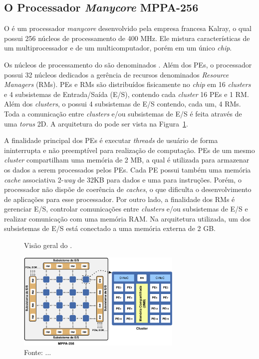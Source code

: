 
\subsection{O Processador \textit{Manycore} MPPA-256}

O \mppa é um processador \textit{manycore} desenvolvido pela empresa francesa
Kalray, o qual possui 256 núcleos de processamento de 400 MHz. Ele mistura características
de um multiprocessador e de um multicomputador, porém em um único \textit{chip}.

Os núcleos de processamento do \mppa são denominados \pes.
Além dos PEs, o processador possui 32 núcleos dedicados a gerência de recursos
denominados \textit{Resource Managers} (RMs). PEs e RMs são distribuídos
fisicamente no \textit{chip} em 16 \textit{clusters} e 4 subsistemas de
Entrada/Saída (E/S), contendo cada \textit{cluster} 16 PEs e 1 RM. Além dos
\textit{clusters}, o \mppa possui 4 subsistemas de E/S contendo, cada um, 4 RMs.
Toda a comunicação entre \textit{clusters} e/ou subsistemas de E/S é feita
através de uma \noc \textit{torus} 2D. A arquitetura do \mppa pode ser vista na
Figura~\ref{fig:mppa}.

A finalidade principal dos PEs é executar \textit{threads} de usuário de forma
ininterrupta e não preemptível para realização de computação. PEs de um mesmo
\textit{cluster} compartilham uma memória de 2 MB, a qual é utilizada para
armazenar os dados a serem processados pelos PEs. Cada PE possui também uma
memória \textit{cache} associativa 2-\textit{way} de 32KB para dados e uma para
instruções. Porém, o processador não dispõe de coerência de \textit{caches}, o
que dificulta o desenvolvimento de aplicações para esse processador. Por outro
lado, a finalidade dos RMs é gerenciar E/S, controlar comunicações entre
\textit{clusters} e/ou subsistemas de E/S e realizar comunicação com uma memória
RAM. Na arquitetura utilizada, um dos subsistemas de E/S está conectado a uma
memória externa \lpddr de 2 GB.

\begin{figure}[t]
	\centering
	\caption{Visão geral do \mppa.}
	\includegraphics[width=0.7\textwidth]{figs/mppa-overall.pdf}
    \caption*{Fonte: ...}
	\label{fig:mppa}
\end{figure}

